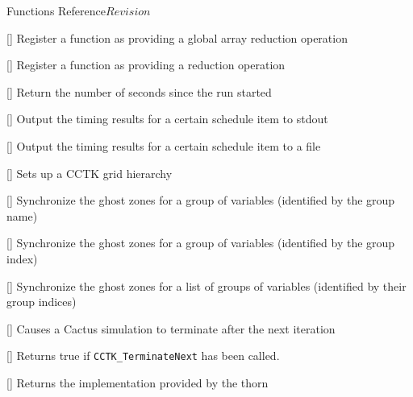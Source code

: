 \begin{cactuspart}{ Functions Reference}{}{$Revision$}
\begin{Lentry}
\item[\code{CCTK\_RegisterReduceArraysGloballyOperator}]
  [\pageref{CCTK-RegisterReduceArraysGloballyOperator}]
  Register a function as providing a global array reduction operation

\item[\code{CCTK\_RegisterReductionOperator}]
  [\pageref{CCTK-RegisterReductionOperator}]
  Register a function as providing a reduction operation

\item[\code{CCTK\_RunTime}]
  [\pageref{CCTK-RunTime}]
  Return the number of seconds since the run started

\item[\code{CCTK\_SchedulePrintTimes}] [\pageref{CCTK-SchedulePrintTimes}]
  Output the timing results for a certain schedule item to stdout

\item[\code{CCTK\_SchedulePrintTimesToFile}] [\pageref{CCTK-SchedulePrintTimesToFile}]
  Output the timing results for a certain schedule item to a file

\item[\code{CCTK\_SetupGH}] [\pageref{CCTK-SetupGH}]
  Sets up a CCTK grid hierarchy

\item[\code{CCTK\_SyncGroup}] [\pageref{CCTK-SyncGroup}]
  Synchronize the ghost zones for a group of variables (identified by the group name)

\item[\code{CCTK\_SyncGroupI}] [\pageref{CCTK-SyncGroupI}]
  Synchronize the ghost zones for a group of variables (identified by the group index)

\item[\code{CCTK\_SyncGroupsI}] [\pageref{CCTK-SyncGroupsI}]
  Synchronize the ghost zones for a list of groups of variables (identified by their group indices)

\item[\code{CCTK\_TerminateNext}] [\pageref{CCTK-TerminateNext}]
  Causes a Cactus simulation to terminate after the next iteration

\item[\code{CCTK\_TerminationReached}] [\pageref{CCTK-TerminationReached}]
  Returns true if {\tt CCTK\_TerminateNext} has been called.

\item[\code{CCTK\_ThornImplementation}]
  [\pageref{CCTK-ThornImplementation}]
  Returns the implementation provided by the thorn


\end{Lentry}
\end{cactuspart}
